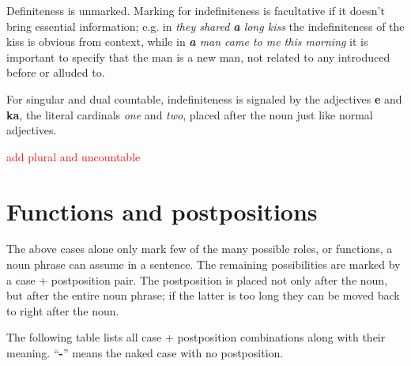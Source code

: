 \documentclass[10pt,oneside]{memoir}
\newcommand{\cmmnt}[1]{\textcolor{red}{#1}}
\begin{document}
Definiteness is unmarked. Marking for indefiniteness is facultative if it doesn't bring essential information; e.g. in \emph{they shared \textbf{a} long kiss} the indefiniteness of the kiss is obvious from context, while in \emph{\textbf{a} man came to me this morning} it is important to specify that the man is a new man, not related to any introduced before or alluded to.

For singular and dual countable, indefiniteness is signaled by the adjectives \textbf{e} and \textbf{ka}, the literal cardinals \emph{one} and \emph{two}, placed after the noun just like normal adjectives. 

\cmmnt{add plural and uncountable}



\pagebreak

\section{Functions and postpositions} \label{postpositions}

The above cases alone only mark few of the many possible roles, or functions, a noun phrase can assume in a sentence. The remaining possibilities are marked by a case + postposition pair. The postposition is placed not only after the noun, but after the entire noun phrase; if the latter is too long they can be moved back to right after the noun.

The following table lists all case + postposition combinations along with their meaning. ``\textbf{-}'' means the naked case with no postposition.

\newcommand{\xline}{\cline{1-2}\cline{4-4}}
\end{document}
